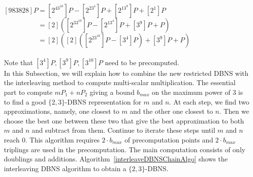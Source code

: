  \\
\\
$[983828]P = [2^43^{10}]P - [2^23^4]P + [2^13^9]P + [2^1]P$ \\
$\phantom{[983828]P} = [2]([2^33^{10}]P - [2^13^4]P + [3^9]P + P)$ \\
$\phantom{[983828]P} = [2]([2]([2^23^{10}]P - [3^4]P) + [3^9]P + P)$ \\
\\
Note that $[3^4]P, [3^9]P, [3^{10}]P$ need to be precomputed. \\

In this Subsection, we will explain how to combine the new restricted DBNS with the interleaving method to compute multi-scalar multiplication.
The essential part to compute $mP_1 + nP_2$ giving a bound $b_{max}$ on the maximum power of 3
is to find a good $\{2,3\}$-DBNS representation for $m$ and $n$.
At each step, we find two approximations, namely, one closest to $m$ and the other one closest to $n$.
Then we choose the best one between these two that give the best approximation to both $m$ and $n$ and subtract from them.
Continue to iterate these steps until $m$ and $n$ reach $0$.
This algorithm requires $2 \cdot b_{max}$ of precomputation points and $2 \cdot b_{max}$ triplings are used in the precomputation.
The main computation consists of only doublings and additions.
Algorithm~\ref{interleaveDBNSChainAlgo} shows the interleaving DBNS algorithm to obtain a $\{2,3\}$-DBNS.

